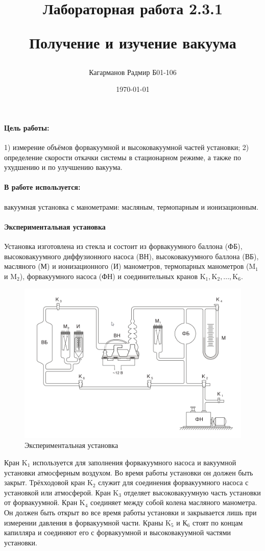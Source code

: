 \documentclass[a4paper,12pt]{article}
\title{Лабораторная работа 2.3.1 

Получение и изучение вакуума}
\author{Кагарманов Радмир Б01-106}
\date{\today}
\begin{document}
\maketitle
\newpage

\paragraph{Цель работы:} 1) измерение объёмов форвакуумной и высоковакуумной частей установки; 2) определение скорости откачки системы в стационарном режиме, а также по ухудшению и по улучшению вакуума.
\paragraph{В работе используется:} вакуумная установка с манометрами: масляным, термопарным и ионизационным.

\paragraph{Экспериментальная установка}
Установка изготовлена из стекла и
состоит из форвакуумного баллона (ФБ), высоковакуумного диффузионного насоса (ВН), высоковакуумного баллона (ВБ), масляного (М) и
ионизационного (И) манометров, термопарных манометров ($\text{M}_1$ и $\text{M}_2$), форвакуумного насоса (ФН) и соединительных кранов $\text{K}_1, \text{K}_2, ..., \text{K}_6$.

\begin{figure}[h]
\centering
\includegraphics[width=0.8\linewidth]{1.png}
\caption{Экспериментальная установка}
\label{fig:mpr}
\end{figure}

Кран $\text{K}_1$ используется для заполнения форвакуумного насоса и вакуумной установки атмосферным воздухом. Во время работы установки он должен быть закрыт. Трёхходовой кран $\text{K}_2$ служит для соединения форвакуумного насоса с установкой или атмосферой. Кран $\text{K}_3$ отделяет
высоковакуумную часть установки от форвакуумной. Кран $\text{K}_4$ соединяет между собой колена масляного манометра. Он должен быть открыт во все время работы установки и закрывается лишь при измерении
давления в форвакуумной части. Краны $\text{K}_5$ и $\text{К}_6$ стоят по концам капилляра и соединяют его с форвакуумной и высоковакуумной частями
установки. 
\end{document}
